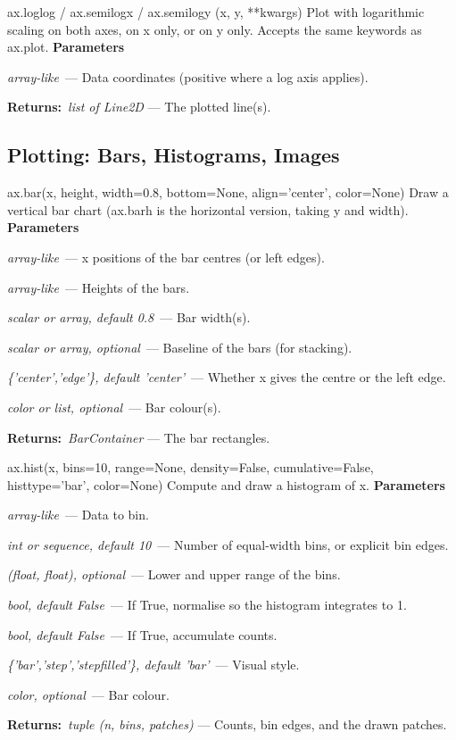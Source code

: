 \documentclass[10pt]{article}
\newenvironment{params}
  {\smallskip\textbf{\small\color{accent}Parameters}\par\nopagebreak
   \begin{description}[leftmargin=1.3em,itemsep=1.5pt,parsep=0pt,topsep=1pt,
      labelindent=0pt,style=sameline,font=\normalfont]}
  {\end{description}}
\newcommand{\pitem}[3]{\item[{\ttfamily\color{accent}#1}]{\itshape #2}\ --- #3}
\newcommand{\preturn}[2]{\smallskip\textbf{\small\color{accent}Returns:}\ {\itshape #1} --- #2\par}
\begin{document}
\begin{func}{ax.loglog / ax.semilogx / ax.semilogy (x, y, **kwargs)}
Plot with logarithmic scaling on both axes, on x only, or on y only. Accepts the same keywords as ax.plot.
\begin{params}
\pitem{x, y}{array-like}{Data coordinates (positive where a log axis applies).}
\end{params}
\preturn{list of Line2D}{The plotted line(s).}
\end{func}
\medskip

\subsection{Plotting: Bars, Histograms, Images}
\begin{func}{ax.bar(x, height, width=0.8, bottom=None, align='center', color=None)}
Draw a vertical bar chart (ax.barh is the horizontal version, taking y and width).
\begin{params}
\pitem{x}{array-like}{x positions of the bar centres (or left edges).}
\pitem{height}{array-like}{Heights of the bars.}
\pitem{width}{scalar or array, default 0.8}{Bar width(s).}
\pitem{bottom}{scalar or array, optional}{Baseline of the bars (for stacking).}
\pitem{align}{\{'center','edge'\}, default 'center'}{Whether x gives the centre or the left edge.}
\pitem{color}{color or list, optional}{Bar colour(s).}
\end{params}
\preturn{BarContainer}{The bar rectangles.}
\end{func}
\medskip

\begin{func}{ax.hist(x, bins=10, range=None, density=False, cumulative=False, histtype='bar', color=None)}
Compute and draw a histogram of x.
\begin{params}
\pitem{x}{array-like}{Data to bin.}
\pitem{bins}{int or sequence, default 10}{Number of equal-width bins, or explicit bin edges.}
\pitem{range}{(float, float), optional}{Lower and upper range of the bins.}
\pitem{density}{bool, default False}{If True, normalise so the histogram integrates to 1.}
\pitem{cumulative}{bool, default False}{If True, accumulate counts.}
\pitem{histtype}{\{'bar','step','stepfilled'\}, default 'bar'}{Visual style.}
\pitem{color}{color, optional}{Bar colour.}
\end{params}
\preturn{tuple (n, bins, patches)}{Counts, bin edges, and the drawn patches.}
\end{func}
\medskip
\end{document}
